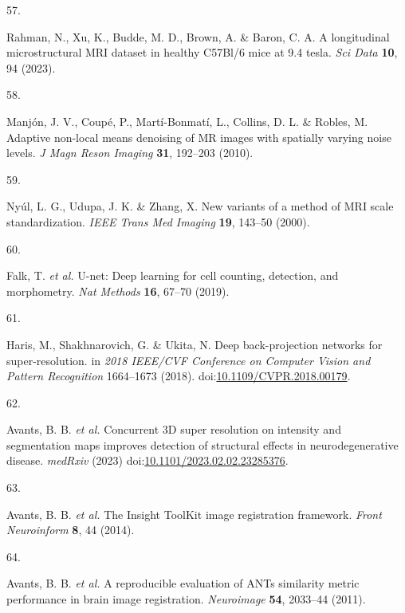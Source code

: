 \documentclass[
  12pt,
]{article}
\newlength{\cslhangindent}
\newlength{\csllabelwidth}
\newenvironment{CSLReferences}[2] %
 {%
  \setlength{\parindent}{0pt}
  \ifodd #1 \everypar{\setlength{\hangindent}{\cslhangindent}}\ignorespaces\fi
  \ifnum #2 > 0
  \setlength{\parskip}{#2\baselineskip}
  \fi
 }%
 {}
\newcommand{\CSLLeftMargin}[1]{\parbox[t]{\csllabelwidth}{#1}}
\newcommand{\CSLRightInline}[1]{\parbox[t]{\linewidth - \csllabelwidth}{#1}\break}
\begin{document}
\begin{CSLReferences}{0}{0}
\leavevmode{}%
\CSLLeftMargin{57. }
\CSLRightInline{Rahman, N., Xu, K., Budde, M. D., Brown, A. \& Baron, C.
A. A longitudinal microstructural MRI dataset in healthy C57Bl/6 mice at
9.4 tesla. \emph{Sci Data} \textbf{10}, 94 (2023).}

\leavevmode{}%
\CSLLeftMargin{58. }
\CSLRightInline{Manjón, J. V., Coupé, P., Martí-Bonmatí, L., Collins, D.
L. \& Robles, M. Adaptive non-local means denoising of {MR} images with
spatially varying noise levels. \emph{J Magn Reson Imaging} \textbf{31},
192--203 (2010).}

\leavevmode{}%
\CSLLeftMargin{59. }
\CSLRightInline{Nyúl, L. G., Udupa, J. K. \& Zhang, X. New variants of a
method of MRI scale standardization. \emph{IEEE Trans Med Imaging}
\textbf{19}, 143--50 (2000).}

\leavevmode{}%
\CSLLeftMargin{60. }
\CSLRightInline{Falk, T. \emph{et al.} U-net: Deep learning for cell
counting, detection, and morphometry. \emph{Nat Methods} \textbf{16},
67--70 (2019).}

\leavevmode{}%
\CSLLeftMargin{61. }
\CSLRightInline{Haris, M., Shakhnarovich, G. \& Ukita, N. Deep
back-projection networks for super-resolution. in \emph{2018 {IEEE/CVF}
{C}onference on {C}omputer {V}ision and {P}attern {R}ecognition}
1664--1673 (2018).
doi:\href{https://doi.org/10.1109/CVPR.2018.00179}{10.1109/CVPR.2018.00179}.}

\leavevmode{}%
\CSLLeftMargin{62. }
\CSLRightInline{Avants, B. B. \emph{et al.} Concurrent 3D super
resolution on intensity and segmentation maps improves detection of
structural effects in neurodegenerative disease. \emph{medRxiv} (2023)
doi:\href{https://doi.org/10.1101/2023.02.02.23285376}{10.1101/2023.02.02.23285376}.}

\leavevmode{}%
\CSLLeftMargin{63. }
\CSLRightInline{Avants, B. B. \emph{et al.} The {Insight} {ToolKit}
image registration framework. \emph{Front Neuroinform} \textbf{8}, 44
(2014).}

\leavevmode{}%
\CSLLeftMargin{64. }
\CSLRightInline{Avants, B. B. \emph{et al.} A reproducible evaluation of
ANTs similarity metric performance in brain image registration.
\emph{Neuroimage} \textbf{54}, 2033--44 (2011).}

\end{CSLReferences}
\end{document}
